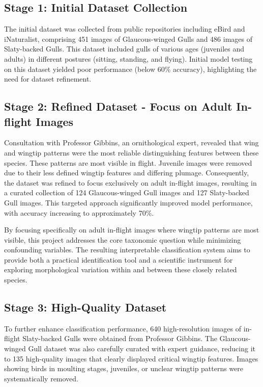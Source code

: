 \documentclass[a4paper,12pt]{report}
\begin{document}
\subsection{Stage 1: Initial Dataset Collection}

The initial dataset was collected from public repositories including eBird and iNaturalist, comprising 451 images of Glaucous-winged Gulls and 486 images of Slaty-backed Gulls. This dataset included gulls of various ages (juveniles and adults) in different postures (sitting, standing, and flying). Initial model testing on this dataset yielded poor performance (below 60\% accuracy), highlighting the need for dataset refinement. 


\subsection{Stage 2: Refined Dataset - Focus on Adult In-flight Images}

Consultation with Professor Gibbins, an ornithological expert, revealed that wing and wingtip patterns were the most reliable distinguishing features between these species. These patterns are most visible in flight. Juvenile images were removed due to their less defined wingtip features and differing plumage. Consequently, the dataset was refined to focus exclusively on adult in-flight images, resulting in a curated collection of 124 Glaucous-winged Gull images and 127 Slaty-backed Gull images. This targeted approach significantly improved model performance, with accuracy increasing to approximately 70\%.

By focusing specifically on adult in-flight images where wingtip patterns are most visible, this project addresses the core taxonomic question while minimizing confounding variables. The resulting interpretable classification system aims to provide both a practical identification tool and a scientific instrument for exploring morphological variation within and between these closely related species.

\subsection{Stage 3: High-Quality Dataset}

To further enhance classification performance, 640 high-resolution images of in-flight Slaty-backed Gulls were obtained from Professor Gibbins. The Glaucous-winged Gull dataset was also carefully curated with expert guidance, reducing it to 135 high-quality images that clearly displayed critical wingtip features.  Images showing birds in moulting stages, juveniles, or unclear wingtip patterns were systematically removed.
\end{document}
